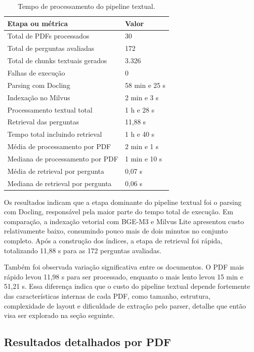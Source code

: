 \begin{table}[htbp]
\centering
\caption{Tempo de processamento do pipeline textual.}
\label{tab:tempo-processamento-textual}
\small
\begin{tabular}{p{7.8cm}p{4.8cm}}
\toprule
\textbf{Etapa ou métrica} & \textbf{Valor} \\
\midrule
Total de PDFs processados & 30 \\
Total de perguntas avaliadas & 172 \\
Total de chunks textuais gerados & 3.326 \\
Falhas de execução & 0 \\
\addlinespace
Parsing com Docling & 58 min e 25 s \\
Indexação no Milvus & 2 min e 3 s \\
Processamento textual total & 1 h e 28 s \\
Retrieval das perguntas & 11,88 s \\
Tempo total incluindo retrieval & 1 h e 40 s \\
\addlinespace
Média de processamento por PDF & 2 min e 1 s \\
Mediana de processamento por PDF & 1 min e 10 s \\
Média de retrieval por pergunta & 0,07 s \\
Mediana de retrieval por pergunta & 0,06 s \\
\bottomrule
\end{tabular}
\end{table}

Os resultados indicam que a etapa dominante do pipeline textual foi o parsing com Docling, responsável pela maior parte do tempo total de execução. Em comparação, a indexação vetorial com BGE-M3 e Milvus Lite apresentou custo relativamente baixo, consumindo pouco mais de dois minutos no conjunto completo. Após a construção dos índices, a etapa de retrieval foi rápida, totalizando 11,88 s para as 172 perguntas avaliadas.

Também foi observada variação significativa entre os documentos. O PDF mais rápido levou 11,98 s para ser processado, enquanto o mais lento levou 15 min e 51,21 s. Essa diferença indica que o custo do pipeline textual depende fortemente das características internas de cada PDF, como tamanho, estrutura, complexidade de layout e dificuldade de extração pelo parser, detalhe que então visa ser explorado na seção seguinte.

\subsection{Resultados detalhados por PDF}

